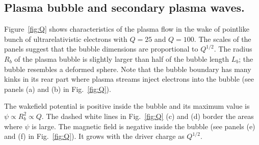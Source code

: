 \documentclass[twocolumn,showpacs,aip]{revtex4}
\begin{document}
\subsection{Plasma bubble and secondary plasma waves. }   



Figure~\ref{fig:Q} shows  characteristics of the plasma flow 
 in the wake  of pointlike bunch of ultrarelativistic electrons with  $Q=25$ and $Q=100$.
The scales of the panels  %
suggest that the bubble dimensions are proportional to $Q^{1/2}$. The  radius $R_b$ of the plasma bubble is slightly larger than half of the bubble length $L_b$;  the bubble resembles a deformed sphere. 
Note that 
the bubble boundary 
 has many kinks in its rear part where plasma streams inject electrons into the bubble (see panels (a) and (b) in Fig.~\ref{fig:Q}).  %



The wakefield potential is positive inside  the bubble and its maximum value is $\psi\propto R_b^2\propto Q$. 
The dashed white lines in Fig.~\ref{fig:Q} (c) and (d) border the  areas where  $\psi$ is large. 
The magnetic field is negative inside  the  bubble (see 
 panels (e) and (f) in Fig.~\ref{fig:Q}). %
    It grows with the driver charge as $Q^{1/2}$.
 
\end{document}
